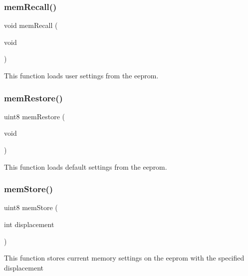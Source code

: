 \subsubsection{mem\+Recall()}
{\footnotesize\ttfamily void mem\+Recall (\begin{DoxyParamCaption}\item[{void}]{ }\end{DoxyParamCaption})}

This function loads user settings from the eeprom. \mbox{\label{command__processing_8c_af67845c368ea7fefb79a1f0baa12134c}} 
\subsubsection{mem\+Restore()}
{\footnotesize\ttfamily uint8 mem\+Restore (\begin{DoxyParamCaption}\item[{void}]{ }\end{DoxyParamCaption})}

This function loads default settings from the eeprom. \mbox{\label{command__processing_8c_a81e6b73c0ee52661736a97c08bdb262b}} 
\subsubsection{mem\+Store()}
{\footnotesize\ttfamily uint8 mem\+Store (\begin{DoxyParamCaption}\item[{int}]{displacement }\end{DoxyParamCaption})}

This function stores current memory settings on the eeprom with the specified displacement 